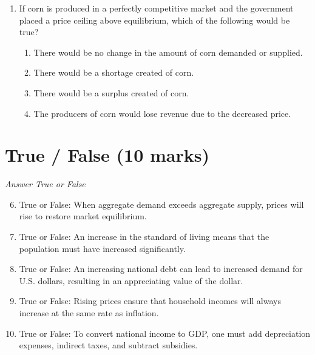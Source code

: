 \documentclass[12pt]{article}
\begin{document}
\begin{enumerate}[label=\arabic*.]
\begin{enumerate}[label=(\alph*)]
    \item Demand is downward-sloping.
    \item The demand curve lies above the marginal revenue curve.
    \item Price is determined by the equilibrium in the entire market.
    \item Average revenue differs from price.
\end{enumerate}
\item If corn is produced in a perfectly competitive market and the government placed a price ceiling above equilibrium, which of the following would be true?
\begin{enumerate}[label=(\alph*)]
    \item There would be no change in the amount of corn demanded or supplied.
    \item There would be a shortage created of corn.
    \item There would be a surplus created of corn.
    \item The producers of corn would lose revenue due to the decreased price.
\end{enumerate}
\end{enumerate}

\section*{True / False (10 marks)}
\textit{Answer True or False}
\begin{enumerate}[label=\arabic*.]
\setcounter{enumi}{5}
\item True or False: When aggregate demand exceeds aggregate supply, prices will rise to restore market equilibrium.
\item True or False: An increase in the standard of living means that the population must have increased significantly.
\item True or False: An increasing national debt can lead to increased demand for U.S. dollars, resulting in an appreciating value of the dollar.
\item True or False: Rising prices ensure that household incomes will always increase at the same rate as inflation.
\item True or False: To convert national income to GDP, one must add depreciation expenses, indirect taxes, and subtract subsidies.
\end{enumerate}
\end{document}
